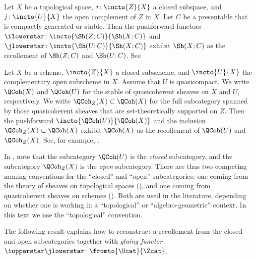 \begin{example}\label{ex:Shrecollement}
	Let $ X $ be a topological space, $ i \colon \incto{Z}{X} $ a closed subspace, and $ j \colon \incto{U}{X} $ the open complement of $ Z $ in $ X $.
	Let $ C $ be a presentable \category that is compactly generated or stable.
	Then the pushforward functors $ \ilowerstar \colon \incto{\Sh(Z;C)}{\Sh(X;C)} $ and $ \jlowerstar \colon \incto{\Sh(U;C)}{\Sh(X;C)} $ exhibit $ \Sh(X;C) $ as the recollement of $ \Sh(Z;C) $ and $ \Sh(U;C) $.
	See \cites[]{HA}[Corollaries 2.12 \& 2.23]{arXiv:2108.03545}
\end{example}

\begin{example}\label{ex:QCohrecollement}
	Let $ X $ be a scheme, $ \incto{Z}{X} $ a closed subscheme, and $ \incto{U}{X} $ the complementary open subscheme in $ X $.
	Assume that $ U $ is quasicompact.
	We write $ \QCoh(X) $ and $ \QCoh(U) $ for the stable \categories of quasicoherent sheaves on $ X $ and $ U $, respectively.
	We write $ \QCoh_{Z}(X) \subset \QCoh(X) $ for the full subcategory spanned by those quasicoherent sheaves that are set-theoretically supported on $ Z $.
	Then the pushforward $ \incto{\QCoh(U)}{\QCoh(X)} $ and the inclusion $ \QCoh_{Z}(X) \subset \QCoh(X) $ exhibit $ \QCoh(X) $ as the recollement of $ \QCoh(U) $ and $ \QCoh_{Z}(X) $.
	See, for example, .
\end{example}

\begin{warning}
	In , note that the subcategory $ \QCoh(U) $ is the \textit{closed} subcategory, and the subcategory $ \QCoh_{Z}(X) $ is the \textit{open} subcategory.
	There are thus two competing naming conventions for the ``closed'' and ``open'' subcategories: one coming from the theory of sheaves on topological spaces (), and one coming from quasicoherent sheaves on schemes ().
	Both are used in the literature, depending on whether one is working in a ``topological'' or
	``algebro-geometric'' context. 
	In this text we use the ``topological'' convention.
\end{warning}

The following result explains how to reconstruct a recollement from the closed and open subcategories together with \textit{gluing functor} $ \iupperstar\jlowerstar \colon \fromto{\Ucat}{\Zcat} $.

